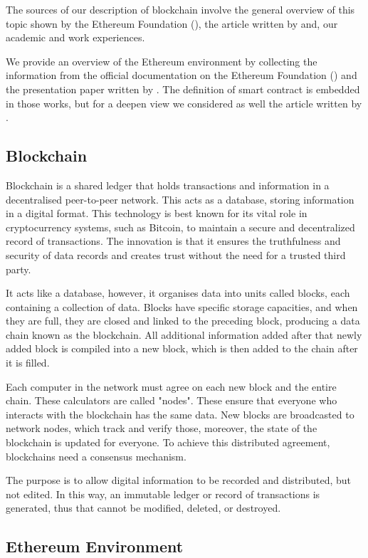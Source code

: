 \documentclass[a4paper,sigconf, language=french,
language=german, language=spanish, language=english]{acmart}
\begin{document}
The sources of our description of blockchain involve the general overview of this topic shown by the Ethereum Foundation (\cite{ETHfoundation}), 
the article written by \cite{BcArticle} and, our academic and work experiences.

We provide an overview of the Ethereum environment by 
collecting the information from the official 
documentation 
on the Ethereum Foundation (\cite{ETHfoundation}) and the presentation paper written by \citet{Ethereum}.
The definition of smart contract is embedded in those works, 
but for a deepen view we considered as well the article written by \citet{ScArticle}.

\subsection{Blockchain}
Blockchain is a shared ledger that holds transactions and information in a decentralised peer-to-peer network. This acts as a database, storing information in a digital format. 
This technology is best known for its vital role in cryptocurrency systems, such as Bitcoin, to maintain a secure and decentralized record of transactions. 
The innovation is that it ensures the truthfulness and security of data records and creates trust without the need for a trusted third party.

It acts like a database, however, it organises data into units called blocks, each containing a collection of data.
Blocks have specific storage capacities, and when they are full, they are closed and linked to the preceding block, producing a data chain known as the blockchain.
All additional information added after that newly added block is compiled into a new block, which is then added to the chain after it is filled.  

Each computer in the network must agree on each new block and the entire chain. 
These calculators are called "nodes". These ensure that everyone who interacts with the blockchain has the same data. 
New blocks are broadcasted to network nodes, which track and verify those, moreover, the state of the blockchain is updated for everyone.
To achieve this distributed agreement, blockchains need a consensus mechanism. 

The purpose is to allow digital information to be recorded and distributed, but not edited. 
In this way, an immutable ledger or record of transactions is generated, thus that cannot be modified, deleted, or destroyed. 


\subsection{Ethereum Environment}
\end{document}

